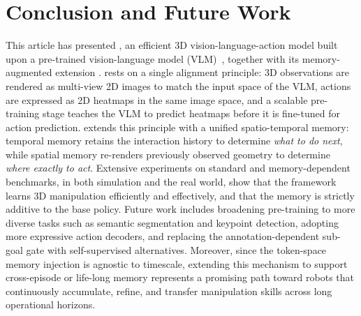 \section{Conclusion and Future Work}
\label{sec:conclusion}
This article has presented \method, an efficient 3D vision-language-action model built upon a pre-trained vision-language model (VLM)~\cite{beyer2024paligemma}, together with its memory-augmented extension \memmethod.
\method rests on a single alignment principle: 3D observations are rendered as multi-view 2D images to match the input space of the VLM, actions are expressed as 2D heatmaps in the same image space, and a scalable pre-training stage teaches the VLM to predict heatmaps before it is fine-tuned for action prediction.
\memmethod extends this principle with a unified spatio-temporal memory: temporal memory retains the interaction history to determine \emph{what to do next}, while spatial memory re-renders previously observed geometry to determine \emph{where exactly to act}.
Extensive experiments on standard and memory-dependent benchmarks, in both simulation and the real world, show that the framework learns 3D manipulation efficiently and effectively, and that the memory is strictly additive to the base policy.
Future work includes broadening pre-training to more diverse tasks such as semantic segmentation and keypoint detection, adopting more expressive action decoders, and replacing the annotation-dependent sub-goal gate with self-supervised alternatives.
Moreover, since the token-space memory injection is agnostic to timescale, 
extending this mechanism to support cross-episode or life-long memory represents a promising path toward robots that continuously accumulate, refine, and transfer manipulation skills across long operational horizons.